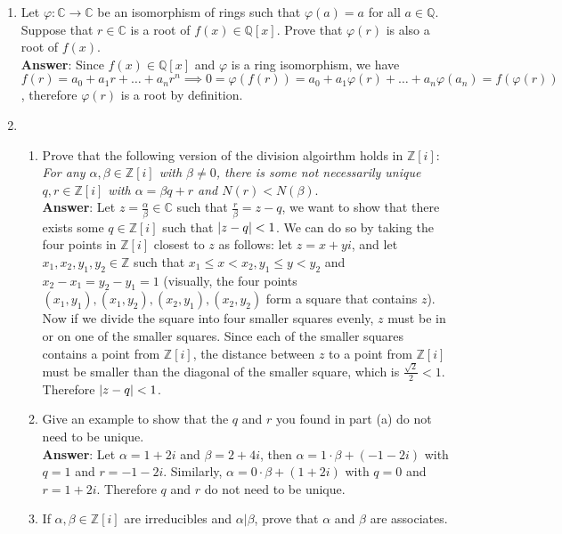 \documentclass{article}
\begin{document}
\begin{enumerate}
\begin{enumerate}
            \end{enumerate}
      \item Let $\varphi:\mathbb{C}\rightarrow\mathbb{C}$ be an isomorphism of rings such that $\varphi(a)=a$ for all $a\in\mathbb{Q}$. Suppose that $r\in\mathbb{C}$ is a root of $f(x)\in\mathbb{Q}[x]$. Prove that $\varphi(r)$ is also a root of $f(x)$.\\
            \textbf{Answer}: Since $f(x)\in\mathbb{Q}[x]$ and $\varphi$ is a ring isomorphism, we have $f(r)=a_0+a_1r+\ldots+a_nr^n\implies 0=\varphi(f(r))=a_0+a_1\varphi(r)+\ldots+a_n\varphi(a_n)=f(\varphi(r))$, therefore $\varphi(r)$ is a root by definition.
      \item
            \begin{enumerate}
                  \item Prove that the following version of the division algoirthm holds in $\mathbb{Z}[i]$: \textit{For any $\alpha,\beta\in\mathbb{Z}[i]$ with $\beta\neq 0$, there is some not necessarily unique $q,r\in\mathbb{Z}[i]$ with $\alpha=\beta q+r$ and $N(r)<N(\beta)$}.\\
                        \textbf{Answer}: Let $z=\frac{\alpha}{\beta}\in\mathbb{C}$ such that $\frac{r}{\beta}=z-q$, we want to show that there exists some $q\in\mathbb{Z}[i]$ such that $\abs{z-q}<1$. We can do so by taking the four points in $\mathbb{Z}[i]$ closest to $z$ as follows: let $z=x+yi$, and let $x_1,x_2,y_1,y_2\in\mathbb{Z}$ such that $x_1\leq x<x_2,y_1\leq y<y_2$ and $x_2-x_1=y_2-y_1=1$ (visually, the four points $(x_1,y_1),(x_1,y_2),(x_2,y_1),(x_2,y_2)$ form a square that contains $z$). Now if we divide the square into four smaller squares evenly, $z$ must be in or on one of the smaller squares. Since each of the smaller squares contains a point from $\mathbb{Z}[i]$, the distance between $z$ to a point from $\mathbb{Z}[i]$ must be smaller than the diagonal of the smaller square, which is $\frac{\sqrt{2}}{2}<1$. Therefore $\abs{z-q}<1$.
                  \item Give an example to show that the $q$ and $r$ you found in part (a) do not need to be unique.\\
                        \textbf{Answer}: Let $\alpha=1+2i$ and $\beta=2+4i$, then $\alpha=1\cdot\beta+(-1-2i)$ with $q=1$ and $r=-1-2i$. Similarly, $\alpha=0\cdot\beta+(1+2i)$ with $q=0$ and $r=1+2i$. Therefore $q$ and $r$ do not need to be unique.
                  \item If $\alpha,\beta\in\mathbb{Z}[i]$ are irreducibles and $\alpha|\beta$, prove that $\alpha$ and $\beta$ are associates.\\

\end{enumerate}
\end{enumerate}
\end{document}
